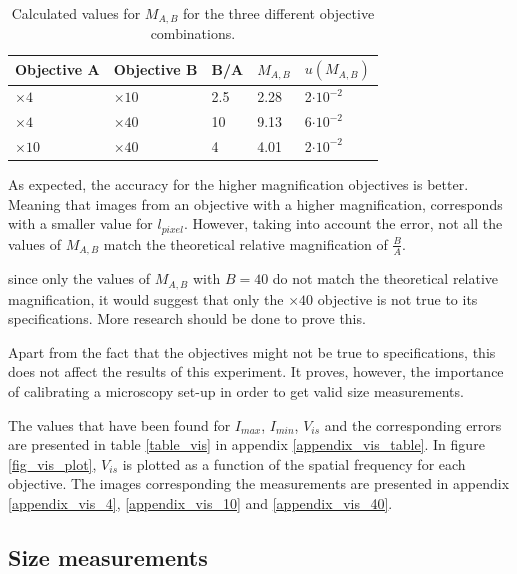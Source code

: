 \begin{table}[h!]


\centering
\captionsetup{font=small, justification = centering}
  \caption{Calculated values for $M_{A,B}$ for the three different objective combinations.}

\begin{tabular}{|l|l|l|l|l|}
\hline

Objective A & Objective B & B/A & $M_{A,B}$ & $u(M_{A,B})$ \\ \hline
$\times 4$ & $\times 10$ & 2.5 & 2.28 & 2$\cdot 10^{-2}$\\
$\times 4$& $\times 40$ & 10 & 9.13 & 6$\cdot 10^{-2}$ \\
$\times 10$ & $\times 40$ & 4 & 4.01 & 2$\cdot 10^{-2}$ \\ \hline
\end{tabular}


\label{table_magnification}
\end{table} 

As expected, the accuracy for the higher magnification objectives is better. Meaning that images from an objective with a higher magnification, corresponds with a smaller value for $l_{pixel}$. However, taking into account the error, not all the values of $M_{A,B}$ match the theoretical relative magnification of $\frac{B}{A}$.

since only the values of $M_{A,B}$ with $B = 40$ do not match the theoretical relative magnification, it would suggest that only the $\times 40$ objective is not true to its specifications. More research should be done to prove this.

Apart from the fact that the objectives might not be true to specifications, this does not affect the results of this experiment. It proves, however, the importance of calibrating a microscopy set-up in order to get valid size measurements.

\bigskip


The values that have been found for $I_{max}$, $I_{min}$, $V_{is}$ and the corresponding errors are presented in table \ref{table_vis} in appendix \ref{appendix_vis_table}. In figure \ref{fig_vis_plot}, $V_{is}$ is plotted as a function of the spatial frequency for each objective. The images corresponding the measurements are presented in appendix \ref{appendix_vis_4}, \ref{appendix_vis_10} and \ref{appendix_vis_40}.



\subsection{Size measurements}

